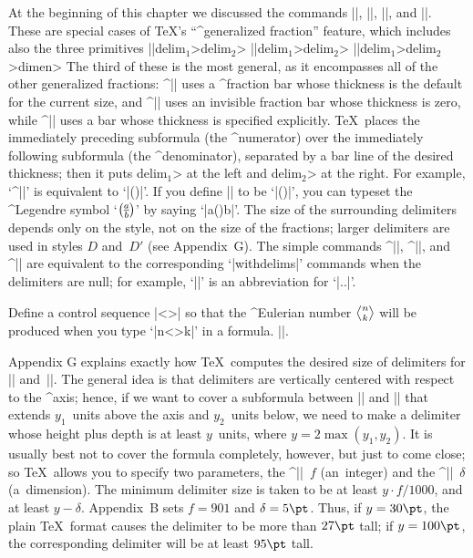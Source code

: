 \ddanger At the beginning of this chapter we discussed the commands
|\over|, |\atop|, |\choose|, and |\above|. These are special cases of
\TeX's ``^{generalized fraction}'' feature, which includes also the
three primitives
\begindisplay
|\overwithdelims|\<delim$_1$>\<delim$_2$>\cr
|\atopwithdelims|\<delim$_1$>\<delim$_2$>\cr
|\abovewithdelims|\<delim$_1$>\<delim$_2$>\<dimen>\cr
\enddisplay
The third of these is the most general, as it encompasses all of the other
generalized fractions:  ^|\overwithdelims| uses a ^{fraction} bar whose
thickness is the default for the current size, and ^|\atopwithdelims| uses
an invisible fraction bar whose thickness is zero, while
^|\abovewithdelims| uses a bar whose thickness is specified explicitly.
\TeX\ places the immediately preceding subformula (the ^{numerator}) over
the immediately following subformula (the ^{denominator}), separated by a
bar line of the desired thickness; then it puts \<delim$_1$> at the left
and \<delim$_2$> at the right. For example, `^|\choose|' is equivalent to
`|\atopwithdelims()|'. If you define |\legendre| to be
`|\overwithdelims()|', you can typeset the ^{Legendre symbol}
\def\legendre{\overwithdelims()}%
`$a\legendre b$' by saying `|{a\legendre b}|'. The size of the surrounding
delimiters depends only on the style, not on the size of the fractions;
larger delimiters are used in styles $D$ and~$D'$ (see Appendix~G\null). The
simple commands ^|\over|, ^|\atop|, and ^|\above| are equivalent to the
corresponding `|withdelims|' commands when the delimiters are null; for
example, `|\over|' is an abbreviation for `|\overwithdelims..|'.

\def\euler{\atopwithdelims<>}
\ddangerexercise Define a control sequence |\euler| so that the
^{Eulerian number} $n\euler k$ will be produced when you type `|{n\euler k}|'
in a formula.
\answer|\def\euler{\atopwithdelims<>}|.

\ddanger Appendix G explains exactly how \TeX\ computes the desired size
of delimiters for |\left| and~|\right|. The general idea is that delimiters
are vertically centered with respect to the ^{axis}; hence, if we want
to cover a subformula between |\left| and |\right| that extends $y_1$~units
above the axis and $y_2$~units below, we need to make a delimiter whose
height plus depth is at least $y$~units, where $y=2\max(y_1,y_2)$.
It is usually best not to cover the formula completely, however,
but just to come close; so \TeX\ allows you to specify
two parameters, the ^|\delimiterfactor|~$f$ (an~integer) and the
^|\delimitershortfall|~$\delta$ (a~dimension). The minimum delimiter size
is taken to be at least $y\cdot f/1000$, and at least $y-\delta$. Appendix~B
sets $f=901$ and $\delta=5\pt$. Thus, if $y=30\pt$, the plain \TeX\ format
causes the delimiter to be more than $27\pt$ tall; if $y=100\pt$, the
corresponding delimiter will be at least $95\pt$ tall.

